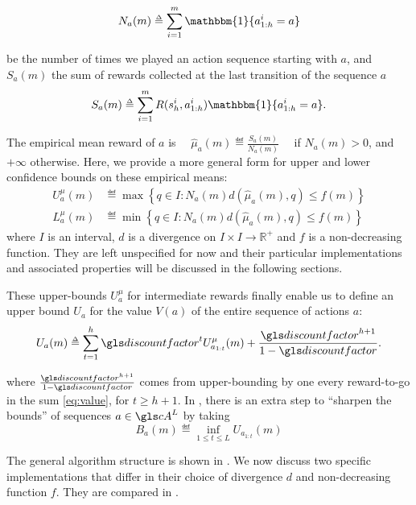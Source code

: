 \begin{equation*}
N_a(m) \eqdef \sum_{i=1}^m \mathbbm{1}\{a^i_{1:h} = a\}
\end{equation*}


\noindent
be the number of times we played an action sequence starting with $a$, and $S_a(m)$ the sum of rewards collected at the last transition of the sequence $a$
\begin{equation*}
S_a(m) \eqdef \sum_{i=1}^m R(s_h^i, a^i_{1:h}) \mathbbm{1}\{a^i_{1:h} = a\}.
\end{equation*}

\noindent
The empirical mean reward of $a$ is
$\quad\displaystyle{ \hat{\mu}_a(m) \eqdef \frac{S_a(m)}{N_a(m)}} \quad $
if $N_a(m) > 0$, and $+\infty$ otherwise. Here, we provide a more general form for upper and lower confidence bounds on these empirical means:
\begin{align}
\label{eq:u_mu_a_m}
U^{\mu}_a(m) &\eqdef \max \left\{q\in I: N_a(m) d(\hat{\mu}_a(m), q) \leq f(m) \right\}\\
L^{\mu}_a(m) &\eqdef \min \left\{q\in I: N_a(m) d(\hat{\mu}_a(m), q) \leq f(m) \right\}
\end{align}
where $I$ is an interval, $d$ is a divergence on $I\times I \rightarrow \mathbb{R^+}$ and $f$ is a non-decreasing function. They are left unspecified for now and their particular implementations and associated properties will be discussed in the following sections.

These upper-bounds $U^{\mu}_a$ for intermediate rewards finally enable us to define an upper bound $U_a$ for the value $V(a)$ of the entire sequence of actions $a$:
\begin{equation}
\label{eq:Ua}
U_a(m) \eqdef \sum_{t=1}^h \discount^t U^{\mu}_{a_{1:t}}(m) + \frac{\discount^{h+1}}{1-\discount}.
\end{equation}


\noindent
where $\frac{\discount^{h+1}}{1-\discount}$ comes from upper-bounding by one every reward-to-go in the sum \eqref{eq:value}, for $t\geq h+1$. In \citep{Bubeck2010}, there is an extra step to \enquote{sharpen the bounds} of sequences $a \in \cA^L$ by taking
\begin{equation}
\label{eq:Ba}
B_a(m) \eqdef \inf_{1 \leq t \leq L} U_{a_{1:t}}(m)
\end{equation}


The general algorithm structure is shown in .
We now discuss two specific implementations that differ in their choice of divergence $d$ and non-decreasing function $f$. They are compared in .

